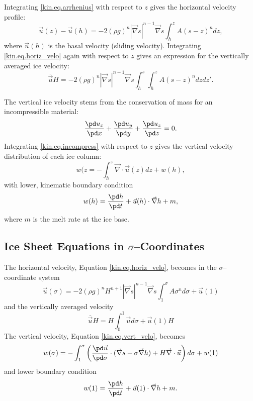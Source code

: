 Integrating \eqref{kin.eq.arrhenius} with respect to $z$ gives the horizontal velocity profile:
\begin{equation}
  \label{kin.eq.horiz_velo}
  \vec u(z)-\vec u(h) = -2(\rho g)^n|\vec\nabla s|^{n-1}\vec\nabla s\int_h^zA(s-z)^ndz,
\end{equation}
where $\vec u(h)$ is the basal velocity (sliding velocity). Integrating \eqref{kin.eq.horiz_velo} again with respect to $z$ gives an expression for the vertically averaged ice velocity:
\begin{equation}
  \label{kin.eq.avg_velo}
  \overline{\vec u}H=-2(\rho g)^n|\vec\nabla s|^{n-1}\vec\nabla s\int_h^s\int_h^zA(s-z)^ndzdz'.
\end{equation}

The vertical ice velocity stems from the conservation of mass for an incompressible material:
\begin{equation}
  \label{kin.eq.incompress}
  \frac{\pd u_x}{\pd x} + \frac{\pd u_y}{\pd y} + \frac{\pd u_z}{\pd z} = 0.
\end{equation}
Integrating \eqref{kin.eq.incompress} with respect to $z$ gives the vertical velocity distribution of each ice column:
\begin{equation}
  \label{kin.eq.vert_velo}
  w(z=-\int_h^z\vec\nabla\cdot\vec u(z)dz+w(h),
\end{equation}
with lower, kinematic boundary condition
\begin{equation}
  w(h)=\frac{\pd h}{\pd t}+\vec u(h)\cdot\vec\nabla h+m,
\end{equation}
where $m$ is the melt rate at the ice base.



\subsection{Ice Sheet Equations in $\sigma$--Coordinates}
The horizontal velocity, Equation \eqref{kin.eq.horiz_velo}, becomes in the $\sigma$--coordinate system
\begin{equation}
  \label{kin.eq.vert_velo_sigma}
  \vec u(\sigma) = -2(\rho g)^nH^{n+1}|\vec\nabla s|^{n-1}\vec\nabla s\int_1^\sigma A\sigma^nd\sigma+\vec u(1)
\end{equation}
and the vertically averaged velocity
\begin{equation}
  \label{kin.eq.avg_velo_scaled}
  \overline{\vec u} H=H\int_0^1\vec ud\sigma+\vec u(1)H
\end{equation}
The vertical velocity, Equation \eqref{kin.eq.vert_velo}, becomes
\begin{equation}
  \label{kin.eq.vert_velo_scaled}
  w(\sigma)=-\int_1^\sigma\left(\frac{\pd\vec u}{\pd\sigma}\cdot(\vec\nabla s-\sigma\vec\nabla h)+H\vec\nabla\cdot\vec u\right)d\sigma+w(1)
\end{equation}
and lower boundary condition
\begin{equation}
  w(1)=\frac{\pd h}{\pd t}+\vec u(1)\cdot\vec\nabla h+m.
\end{equation}

